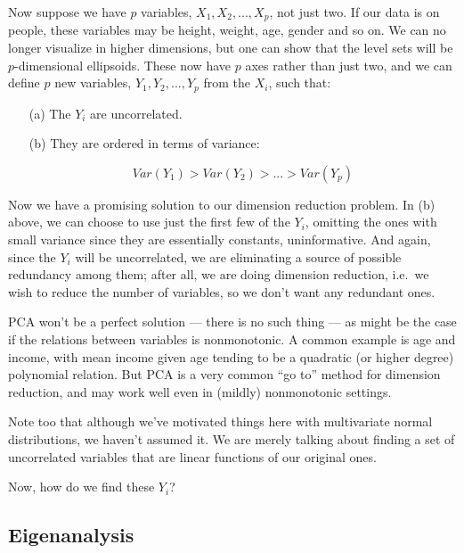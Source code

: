 Now suppose we have $p$ variables, $X_1,
X_2,...,X_p$, not just two.  If our data is on people, these variables
may be height, weight, age, gender and so on.  We can no longer
visualize in higher dimensions, but one can show that the level sets
will be $p$-dimensional ellipsoids.  These now have $p$ axes rather than
just two, and we can define $p$ new variables, $Y_1,Y_2,...,Y_p$ from
the $X_i$, such that:

\begin{itemize}

\item [(a)] The $Y_i$ are uncorrelated.

\item [(b)] They are ordered in terms of variance:

\begin{equation}
Var(Y_1) > Var(Y_2) > ... > Var(Y_p)
\end{equation}

\end{itemize} 

Now we have a promising solution to our dimension reduction problem.  In
(b) above, we can choose to use just the first few of the $Y_i$,
omitting the ones with small variance since they are essentially
constants, uninformative.  And again, since the $Y_i$ will be
uncorrelated, we are eliminating a source of possible redundancy among
them; after all, we are doing dimension reduction, i.e.\ we wish to
reduce the number of variables, so we don't want any redundant ones.

PCA won't be a perfect solution --- there is no such thing --- as might
be the case if the relations between variables is nonmonotonic.  A
common example is age and income, with mean income given age tending to be a
quadratic (or higher degree) polynomial relation.  But PCA is a very
common ``go to'' method for dimension reduction, and may work well even
in (mildly) nonmonotonic settings.

Note too that although we've motivated things here with multivariate
normal distributions, we haven't assumed it.  We are merely talking
about finding a set of uncorrelated variables that are linear functions
of our original ones.

Now, how do we find these $Y_i$?

\subsection{Eigenanalysis}

